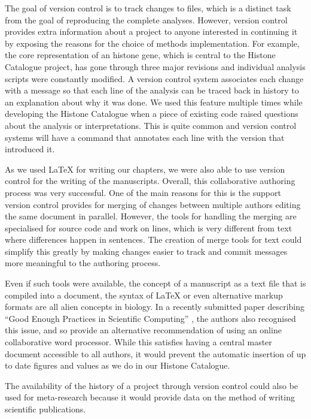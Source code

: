 The goal of version control is to track changes to files, which is a
distinct task from the goal of reproducing the complete analyses.
However, version control provides extra information about a project to
anyone interested in continuing it by exposing the reasons for the
choice of methods implementation.  For example, the core
representation of an histone gene,
which is central to the Histone Catalogue project, has gone through
three major revisions and individual analysis scripts were constantly
modified.  A version control system associates each change with a
message so that each line of the analysis can be traced back in
history to an explanation about why it was done.  We used this
feature multiple times while developing the Histone Catalogue when a
piece of existing code raised questions about the analysis or interpretations.
This is quite common and version control systems will have a command
that annotates each line with the version that
introduced it.

As we used \LaTeX{} for
writing our chapters, we were also able to use version control for
the writing of the manuscripts.
Overall, this collaborative authoring process was very successful.
One of the main reasons for this
is the support version control
provides for merging of changes between multiple authors
editing the same document in parallel.  However, the tools for
handling the merging are specialised for source code and work on
lines, which is very different from text where differences
happen in sentences.  The creation of merge tools for text could
simplify this greatly by making changes easier to track and commit
messages more meaningful to the authoring process.

Even if such tools were available, the concept of a manuscript as a text
file that is compiled into a document, the syntax of \LaTeX{} or even
alternative markup formats are all alien concepts in biology.
In a recently submitted paper describing ``Good Enough
Practices in Scientific Computing'' \citep{good-enough-2016-v2}, the
authors also recognised this issue, and so provide an alternative
recommendation of using an online collaborative word processor.  While
this satisfies having a central master document accessible to all
authors, it would prevent the automatic insertion of up to date
figures and values as we do in our Histone Catalogue.

The availability of the history of a project through version control
could also be used for meta-research because it would provide data on the
method of writing scientific publications.

